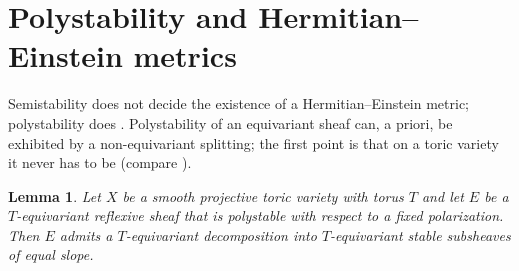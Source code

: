 \documentclass[11pt]{amsart}
\newtheorem{lemma}[theorem]{Lemma}
\theoremstyle{definition}
\theoremstyle{remark}
\begin{document}
\section{Polystability and Hermitian--Einstein metrics}
\label{sec:polystable}

Semistability does not decide the existence of a Hermitian--Einstein
metric; polystability does \cite{Donaldson1985,UhlenbeckYau1986}.
Polystability of an equivariant sheaf can, a priori, be exhibited by a
non-equivariant splitting; the first point is that on a toric variety it
never has to be (compare \cite{Klyachko1990,Kool2011}).

\begin{lemma}\label{lem:equivpoly}
Let $X$ be a smooth projective toric variety with torus $T$ and let $E$
be a $T$-equivariant reflexive sheaf that is polystable with respect to a
fixed polarization. Then $E$ admits a $T$-equivariant decomposition into
$T$-equivariant stable subsheaves of equal slope.
\end{lemma}
\end{document}
